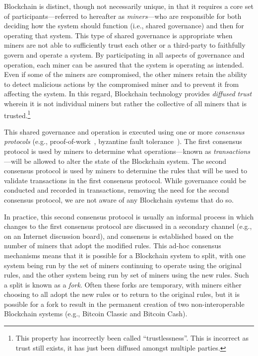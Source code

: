 Blockchain is distinct, though not necessarily unique, in that it requires a core set of participants---referred to hereafter as \emph{miners}---who are responsible for both deciding how the system should function (i.e., shared governance) and then for operating that system.
This type of shared governance is appropriate when miners are not able to sufficiently trust each other or a third-party to faithfully govern and operate a system.
By participating in all aspects of governance and operation, each miner can be assured that the system is operating as intended.
Even if some of the miners are compromised, the other miners retain the ability to detect malicious actions by the compromised miner and to prevent it from affecting the system.
In this regard, Blockchain technology provides \emph{diffused trust} wherein it is not individual miners but rather the collective of all miners that is trusted.\footnote{This property has incorrectly been called ``trustlessness''. This is incorrect as trust still exists, it has just been diffused amongst multiple parties.} 

This shared governance and operation is executed using one or more \emph{consensus protocols} (e.g., proof-of-work~\cite{DN93,back1997partial,NakamotoS8}, byzantine fault tolerance~\cite{castro1999practical}).
The first consensus protocol is used by miners to determine what operations---known as \emph{transactions}---will be allowed to alter the state of the Blockchain system.
The second consensus protocol is used by miners to determine the rules that will be used to validate transactions in the first consensus protocol.
While governance could be conducted and recorded in transactions, removing the need for the second consensus protocol, we are not aware of any Blockchain systems that do so.

In practice, this second consensus protocol is usually an informal process in which changes to the first consensus protocol are discussed in a secondary channel (e.g., on an Internet discussion board), and consensus is established based on the number of miners that adopt the modified rules.
This ad-hoc consensus mechanisms means that it is possible for a Blockchain system to split, with one system being run by the set of miners continuing to operate using the original rules, and the other system being run by set of miners using the new rules.
Such a split is known as a \emph{fork}.
Often these forks are temporary, with miners either choosing to all adopt the new rules or to return to the original rules, but it is possible for a fork to result in the permanent creation of two non-interoperable Blockchain systems (e.g., Bitcoin Classic and Bitcoin Cash).

